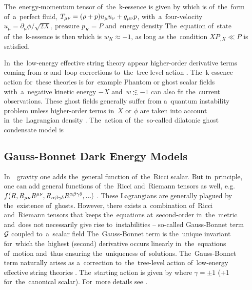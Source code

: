 The~energy-momentum tensor of~the~k-essence is given by
which is of~the~form of~a~perfect fluid, $T_{\mu\nu}=(\rho+p)u_\mu u_\nu+g_{\mu\nu} p$, with~a~four-velocity $u_\mu=\partial_\mu\phi/\sqrt{2X}$, pressure $p_K=P$ and~energy density
The~equation of~state of~the~k-essence is then
which is $w_K\approx-1$, as long as the~condition $XP_{,X}\ll P$ is satisfied.

In~the~low-energy effective string theory appear higher-order derivative terms coming from $\alpha$ and~loop corrections to~the~tree-level action \parencite{2003PhR...373....1G}. The~k-essence action for~these theories is for~example
Phantom or ghost scalar fields with~a~negative kinetic energy $-X$ and~$w\lesssim-1$ can also fit the~current observations. These ghost fields generally suffer from a~quantum instability problem unless higher-order terms in~$X$ or $\phi$ are taken into account in~the~Lagrangian density \parencite{2010deto.book.....A}. The~action of~the~so-called dilatonic ghost condensate model is \parencite{2004JCAP...07..004P}
\subsection{Gauss-Bonnet Dark Energy Models}
In~\fR\ gravity one adds the~general function of~the~Ricci scalar. But in~principle, one can add general functions of~the~Ricci and~Riemann tensors as well, e.g. $f(R,R_{\mu\nu} R^{\mu\nu},R_{\alpha\beta\gamma\delta}R^{\alpha\beta\gamma\delta},...)$ \parencite{2005PhRvD..71f3513C}. These Lagrangians are generally plagued by the~existence of~ghosts.  However, there exists a~combination of~Ricci and~Riemann tensors that keeps the~equations at~second-order in~the~metric and~does not necessarily give rise to~instabilities -- so-called Gauss-Bonnet term $\mathcal{G}$ coupled to~a~scalar field
The~Gauss-Bonnet term is the~unique invariant for~which the~highest (second) derivative occurs linearly in~the~equations of~motion and~thus ensuring the~uniqueness of~solutions. The~Gauss-Bonnet term naturally arises as a~correction to~the~tree-level action of~low-energy effective string theories \parencite{2000PhR...337..343L}. The~starting action is given by
where $\gamma=\pm1$ (+1 for~the~canonical scalar). For~more details see \textcite{2005PhRvD..71l3509N,2006JCAP...06..004N,2013PhRvD..87h4037C}.
